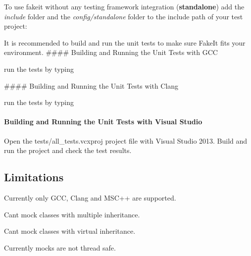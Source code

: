 \begin{DoxyItemize}
\item To use fakeit without any testing framework integration ({\bfseries{standalone}}) add the {\itshape include} folder and the {\itshape config/standalone} folder to the include path of your test project\+: 
\begin{DoxyCode}{0}
\end{DoxyCode}
 It is recommended to build and run the unit tests to make sure Fake\+It fits your environment. \#\#\#\# Building and Running the Unit Tests with G\+CC 
\begin{DoxyCode}{0}
\end{DoxyCode}
 run the tests by typing 
\begin{DoxyCode}{0}
\end{DoxyCode}
 \#\#\#\# Building and Running the Unit Tests with Clang 
\begin{DoxyCode}{0}
\end{DoxyCode}
 run the tests by typing 
\begin{DoxyCode}{0}
\end{DoxyCode}
 \paragraph*{Building and Running the Unit Tests with Visual Studio}
\end{DoxyItemize}

Open the tests/all\+\_\+tests.\+vcxproj project file with Visual Studio 2013. Build and run the project and check the test results. \subsection*{Limitations}


\begin{DoxyItemize}
\item Currently only G\+CC, Clang and M\+S\+C++ are supported.
\item Can\textquotesingle{}t mock classes with multiple inheritance.
\item Can\textquotesingle{}t mock classes with virtual inheritance.
\item Currently mocks are not thread safe. 
\end{DoxyItemize}